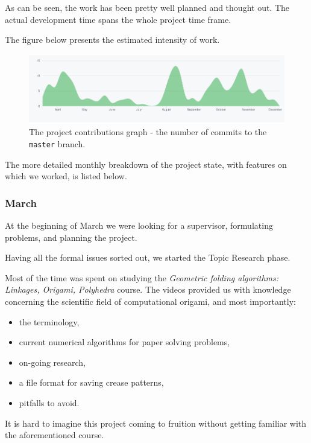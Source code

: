 As can be seen, the work has been pretty well planned and thought out. The actual development time spans the whole project time frame.

The figure below presents the estimated intensity of work.

\begin{figure}[H]
	\label{04-commit-intensity}
	\caption{The project contributions graph - the number of commits to the \texttt{master} branch.}
  \centering
    \includegraphics[width=1.01\textwidth]{assets/4-contributions-graph.png}
\end{figure}

The more detailed monthly breakdown of the project state, with features on which we worked, is listed below.

\subsubsection{March}

At the beginning of March we were looking for a supervisor, formulating problems, and planning the project.

\medskip

Having all the formal issues sorted out, we started the Topic Research phase.

Most of the time was spent on studying the \textit{Geometric folding algorithms: Linkages, Origami, Polyhedra} course\cite{mit-course}. The videos provided us with knowledge concerning the scientific field of computational origami, and most importantly:
\begin{itemize}
	\item the terminology,
	\item current numerical algorithms for paper solving problems,
	\item on-going research,
	\item a file format for saving crease patterns,
	\item pitfalls to avoid.
\end{itemize}

It is hard to imagine this project coming to fruition without getting familiar with the aforementioned course.


